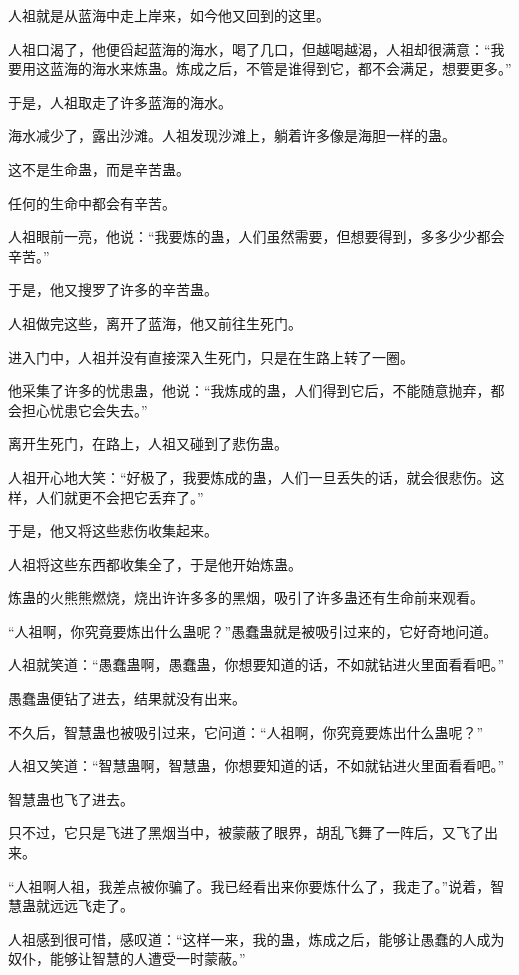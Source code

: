 \begin{this_body}
人祖就是从蓝海中走上岸来，如今他又回到的这里。

人祖口渴了，他便舀起蓝海的海水，喝了几口，但越喝越渴，人祖却很满意：“我要用这蓝海的海水来炼蛊。炼成之后，不管是谁得到它，都不会满足，想要更多。”

于是，人祖取走了许多蓝海的海水。

海水减少了，露出沙滩。人祖发现沙滩上，躺着许多像是海胆一样的蛊。

这不是生命蛊，而是辛苦蛊。

任何的生命中都会有辛苦。

人祖眼前一亮，他说：“我要炼的蛊，人们虽然需要，但想要得到，多多少少都会辛苦。”

于是，他又搜罗了许多的辛苦蛊。

人祖做完这些，离开了蓝海，他又前往生死门。

进入门中，人祖并没有直接深入生死门，只是在生路上转了一圈。

他采集了许多的忧患蛊，他说：“我炼成的蛊，人们得到它后，不能随意抛弃，都会担心忧患它会失去。”

离开生死门，在路上，人祖又碰到了悲伤蛊。

人祖开心地大笑：“好极了，我要炼成的蛊，人们一旦丢失的话，就会很悲伤。这样，人们就更不会把它丢弃了。”

于是，他又将这些悲伤收集起来。

人祖将这些东西都收集全了，于是他开始炼蛊。

炼蛊的火熊熊燃烧，烧出许许多多的黑烟，吸引了许多蛊还有生命前来观看。

“人祖啊，你究竟要炼出什么蛊呢？”愚蠢蛊就是被吸引过来的，它好奇地问道。

人祖就笑道：“愚蠢蛊啊，愚蠢蛊，你想要知道的话，不如就钻进火里面看看吧。”

愚蠢蛊便钻了进去，结果就没有出来。

不久后，智慧蛊也被吸引过来，它问道：“人祖啊，你究竟要炼出什么蛊呢？”

人祖又笑道：“智慧蛊啊，智慧蛊，你想要知道的话，不如就钻进火里面看看吧。”

智慧蛊也飞了进去。

只不过，它只是飞进了黑烟当中，被蒙蔽了眼界，胡乱飞舞了一阵后，又飞了出来。

“人祖啊人祖，我差点被你骗了。我已经看出来你要炼什么了，我走了。”说着，智慧蛊就远远飞走了。

人祖感到很可惜，感叹道：“这样一来，我的蛊，炼成之后，能够让愚蠢的人成为奴仆，能够让智慧的人遭受一时蒙蔽。”


\end{this_body}
